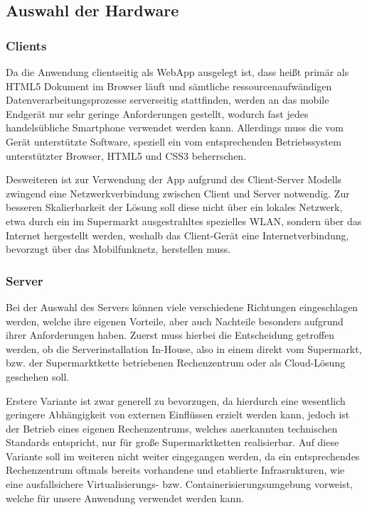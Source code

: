 \subsection{Auswahl der Hardware}
\subsubsection{Clients}
Da die Anwendung clientseitig als WebApp ausgelegt ist, dass heißt primär als HTML5 Dokument im Browser läuft und sämtliche ressourcenaufwändigen Datenverarbeitungsprozesse serverseitig stattfinden,
werden an das mobile Endgerät nur sehr geringe Anforderungen gestellt, wodurch fast jedes handelsübliche Smartphone verwendet werden kann. Allerdings muss die vom Gerät unterstützte Software,
speziell ein vom entsprechenden Betriebssystem unterstützter Browser, HTML5 und CSS3 beherrschen. 

Desweiteren ist zur Verwendung der App aufgrund des Client-Server Modells zwingend eine Netzwerkverbindung zwischen Client und Server notwendig. 
Zur besseren Skalierbarkeit der Lösung soll diese nicht über ein lokales Netzwerk, etwa durch ein im Supermarkt ausgestrahltes spezielles \ac{WLAN}, sondern über das Internet hergestellt werden, weshalb das Client-Gerät eine Internetverbindung, bevorzugt über das Mobilfunknetz, herstellen muss.

\subsubsection{Server}
Bei der Auswahl des Servers können viele verschiedene Richtungen eingeschlagen werden, welche ihre eigenen Vorteile, aber auch Nachteile besonders aufgrund ihrer Anforderungen haben.
Zuerst muss hierbei die Entscheidung getroffen werden, ob die Serverinstallation In-House, also in einem direkt vom Supermarkt, bzw. der Supermarktkette betriebenen Rechenzentrum oder als Cloud-Lösung geschehen soll. 

Erstere Variante ist zwar generell zu bevorzugen, da hierdurch eine wesentlich geringere Abhängigkeit von externen Einflüssen erzielt werden kann, jedoch ist der Betrieb eines eigenen Rechenzentrums, welches anerkannten technischen Standards entspricht, nur für große Supermarktketten realisierbar.
Auf diese Variante soll im weiteren nicht weiter eingegangen werden, da ein entsprechendes Rechenzentrum oftmals bereits vorhandene und etablierte Infrasrukturen, wie eine ausfallsichere Virtualisierungs- bzw. Containerisierungsumgebung vorweist, welche für unsere Anwendung verwendet werden kann.

